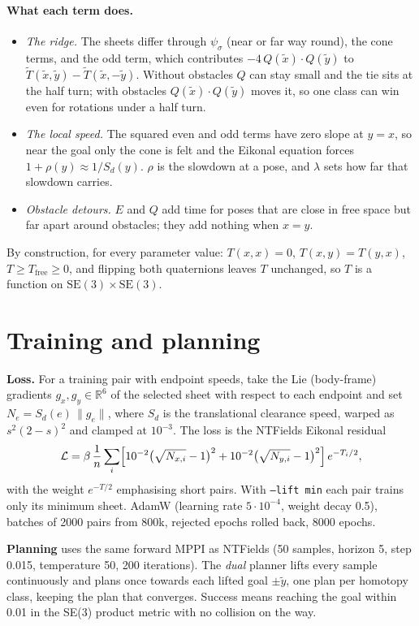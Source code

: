 \documentclass[10pt]{article}
\newcommand{\T}{\tilde T}
\newcommand{\xt}{\tilde x}
\newcommand{\yt}{\tilde y}
\begin{document}
\paragraph{What each term does.}
\begin{itemize}\setlength\itemsep{1pt}
  \item \emph{The ridge.} The sheets differ through $\psi_\sigma$ (near or far way round), the cone terms, and the odd
        term, which contributes $-4\,Q(\xt)\cdot Q(\yt)$ to $\T(\xt,\yt)-\T(\xt,-\yt)$. Without obstacles $Q$ can stay small and the tie sits at the half turn; with
        obstacles $Q(\xt)\cdot Q(\yt)$ moves it, so one class can win even for rotations under a half turn.
  \item \emph{The local speed.} The squared even and odd terms have zero slope at $y=x$, so near the goal only the cone
        is felt and the Eikonal equation forces $1+\rho(y)\approx1/S_d(y)$. $\rho$ is the slowdown at a pose, and $\lambda$
        sets how far that slowdown carries.
  \item \emph{Obstacle detours.} $E$ and $Q$ add time for poses that are close in free space but far apart around
        obstacles; they add nothing when $x=y$.
\end{itemize}
By construction, for every parameter value: $T(x,x)=0$, $T(x,y)=T(y,x)$, $T\ge T_{\mathrm{free}}\ge0$, and flipping
both quaternions leaves $T$ unchanged, so $T$ is a function on $\mathrm{SE}(3)\times\mathrm{SE}(3)$.

\section{Training and planning}
\textbf{Loss.} For a training pair with endpoint speeds, take the Lie (body-frame) gradients $g_x,g_y\in\mathbb{R}^6$ of
the selected sheet with respect to each endpoint and set $N_e=S_d(e)\,\|g_e\|$, where $S_d$ is the translational
clearance speed, warped as $s^2(2-s)^2$ and clamped at $10^{-3}$. The loss is the NTFields Eikonal residual
\[
  \mathcal{L}=\beta\,\frac{1}{n}\sum_{i}\Bigl[10^{-2}\bigl(\sqrt{N_{x,i}}-1\bigr)^2+10^{-2}\bigl(\sqrt{N_{y,i}}-1\bigr)^2\Bigr]\,e^{-T_i/2},
\]
with the weight $e^{-T/2}$ emphasising short pairs. With \texttt{--lift min} each pair trains only its minimum sheet.
AdamW (learning rate $5\cdot10^{-4}$, weight decay 0.5), batches of 2000 pairs from 800k, rejected epochs rolled back,
8000 epochs.

\textbf{Planning} uses the same forward MPPI as NTFields (50 samples, horizon 5, step 0.015, temperature 50, 200
iterations). The \emph{dual} planner lifts every sample continuously and plans once towards each lifted goal $\pm\yt$,
one plan per homotopy class, keeping the plan that converges. Success means reaching the goal within 0.01 in the SE(3)
product metric with no collision on the way.
\end{document}
